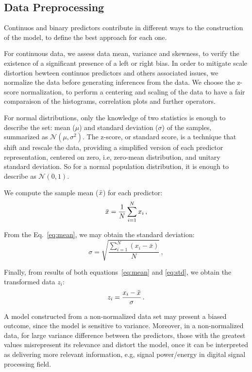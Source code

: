 \subsection{Data Preprocessing}
Continuos and binary predictors contribute in different ways to the construction of the model, to define the best approach for each one. 

For continuous data, we assess data mean, variance and skewness, to verify the existence of a significant presence of a left or right bias. In order to mitigate scale distortion bewteen continuos predictors and others associated issues, we normalize the data before generating inferences from the data. We choose the z-score normalization, to perform a centering and scaling of the data to have a fair comparaison of the histograms, correlation plots and further operators. 

For normal distributions, only the knowledge of two statistics is enough to describe the set: mean ($\mu$) and standard deviation ($\sigma$) of the samples, summarized as $\mathcal{N}(\mu, \sigma^2)$. The z-score, or standard score, is a technique that shift and rescale the data, providing a simplified version of each predictor representation, centered on zero, i.e, zero-mean distribution, and unitary standard deviation. So for a normal population distribution, it is enough to describe as $\mathcal{N}(0, 1)$.

We compute the sample mean ($\Bar{x}$) for each predictor:
\begin{equation}
  \Bar{x} = \frac{1}{N} \sum_{i=1}^{N} x_i \, , \label{eq:mean}
\end{equation}

From the Eq.~\ref{eq:mean}, we may obtain the standard deviation:
\begin{equation}
  \sigma = \sqrt{\frac{\sum_{i=1}^{N} (x_i - \bar{x})}{N}} \, , \label{eq:std}
\end{equation}

Finally, from results of both equations~\ref{eq:mean} and \ref{eq:std}, we obtain the transformed data $z_i$:
\begin{equation}
  z_i = \frac{x_i - \Bar{x}}{\sigma} \, .
\end{equation}

A model constructed from a non-normalized data set may present a biased outcome, since the model is sensitive to variance. Moreover, in a non-normalized data, for large variance difference between the predictors, those with the greatest values misrepresent its relevance and distort the model, once it can be interpreted as delivering more relevant information, e.g, signal power/energy in digital signal processing field.

